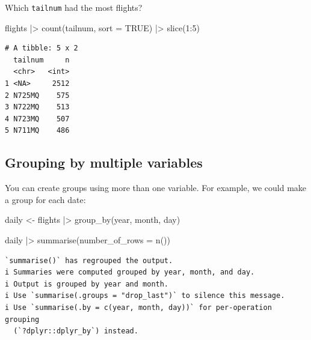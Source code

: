 \documentclass[
  letterpaper,
  DIV=11,
  numbers=noendperiod]{scrreprt}
\newenvironment{Shaded}{\begin{snugshade}}{\end{snugshade}}
\newcommand{\AttributeTok}[1]{\textcolor[rgb]{0.40,0.45,0.13}{#1}}
\newcommand{\ConstantTok}[1]{\textcolor[rgb]{0.56,0.35,0.01}{#1}}
\newcommand{\DecValTok}[1]{\textcolor[rgb]{0.68,0.00,0.00}{#1}}
\newcommand{\FunctionTok}[1]{\textcolor[rgb]{0.28,0.35,0.67}{#1}}
\newcommand{\NormalTok}[1]{\textcolor[rgb]{0.00,0.23,0.31}{#1}}
\newcommand{\OtherTok}[1]{\textcolor[rgb]{0.00,0.23,0.31}{#1}}
\newcommand{\SpecialCharTok}[1]{\textcolor[rgb]{0.37,0.37,0.37}{#1}}
\begin{document}
Which \texttt{tailnum} had the most flights?

\begin{Shaded}
\begin{Highlighting}[]
\NormalTok{flights }\SpecialCharTok{|\textgreater{}}
  \FunctionTok{count}\NormalTok{(tailnum, }\AttributeTok{sort =} \ConstantTok{TRUE}\NormalTok{) }\SpecialCharTok{|\textgreater{}}
  \FunctionTok{slice}\NormalTok{(}\DecValTok{1}\SpecialCharTok{:}\DecValTok{5}\NormalTok{)}
\end{Highlighting}
\end{Shaded}

\begin{verbatim}
# A tibble: 5 x 2
  tailnum     n
  <chr>   <int>
1 <NA>     2512
2 N725MQ    575
3 N722MQ    513
4 N723MQ    507
5 N711MQ    486
\end{verbatim}

\subsection{Grouping by multiple
variables}\label{grouping-by-multiple-variables}

You can create groups using more than one variable. For example, we
could make a group for each date:

\begin{Shaded}
\begin{Highlighting}[]
\NormalTok{daily }\OtherTok{\textless{}{-}}\NormalTok{ flights }\SpecialCharTok{|\textgreater{}}
  \FunctionTok{group\_by}\NormalTok{(year, month, day)}
\end{Highlighting}
\end{Shaded}

\begin{Shaded}
\begin{Highlighting}[]
\NormalTok{daily }\SpecialCharTok{|\textgreater{}}
  \FunctionTok{summarise}\NormalTok{(}\AttributeTok{number\_of\_rows =} \FunctionTok{n}\NormalTok{())}
\end{Highlighting}
\end{Shaded}

\begin{verbatim}
`summarise()` has regrouped the output.
i Summaries were computed grouped by year, month, and day.
i Output is grouped by year and month.
i Use `summarise(.groups = "drop_last")` to silence this message.
i Use `summarise(.by = c(year, month, day))` for per-operation grouping
  (`?dplyr::dplyr_by`) instead.
\end{verbatim}
\end{document}
